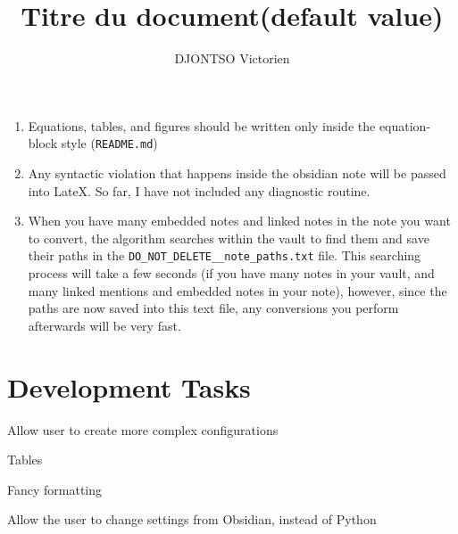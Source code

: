 \documentclass{doc_class_fontsize}{extarticle}
\begin{document}
\allowdisplaybreaks{}

\date{} 
\author{DJONTSO Victorien}
\title{Titre du document(default value)} %



\tableofcontents{}
\newpage{}


\begin{enumerate}
\item Equations, tables, and figures should be written only inside the equation-block style (\texttt{README.md})
\item Any syntactic violation that happens inside the obsidian note will be passed into LateX. So far, I have not included any diagnostic routine.
\item When you have many embedded notes and linked notes in the note you want to convert, the algorithm searches within the vault to find them and save their paths in the \texttt{DO_NOT_DELETE__note_paths.txt} file. This searching process will take a few seconds (if you have many notes in your vault, and many linked mentions and embedded notes in your note), however, since the paths are now saved into this text file, any conversions you perform afterwards will be very fast.
\end{enumerate}





\section{Development Tasks}


\begin{todolist}
\item Allow user to create more complex configurations
\item Tables
\begin{todolist}
\item Fancy formatting
\end{todolist}
\item Allow the user to change settings from Obsidian, instead of Python
\end{todolist}
\end{document}
